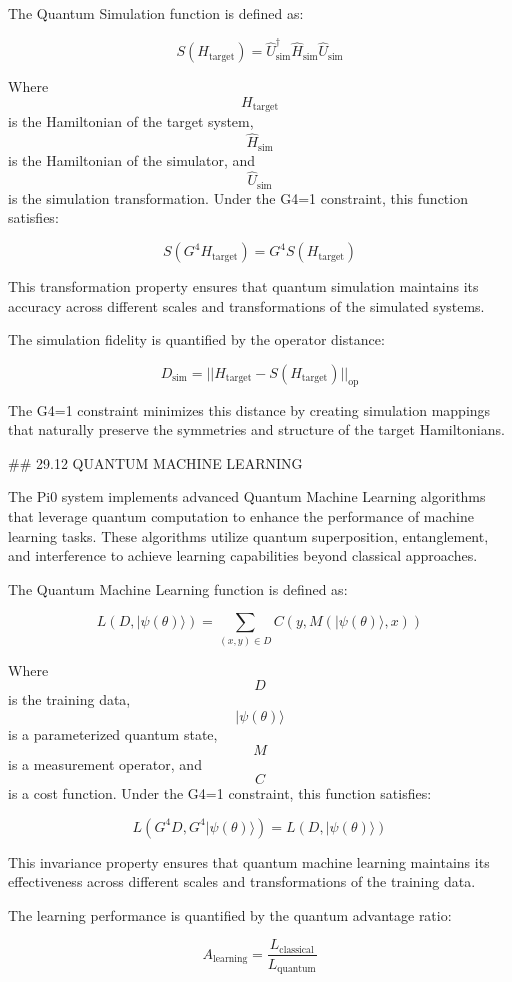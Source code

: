 The Quantum Simulation function is defined as:

$$ S(H_{\text{target}}) = \hat{U}_{\text{sim}}^{\dagger} \hat{H}_{\text{sim}} \hat{U}_{\text{sim}} $$

Where $$ H_{\text{target}} $$ is the Hamiltonian of the target system, $$ \hat{H}_{\text{sim}} $$ is the Hamiltonian of the simulator, and $$ \hat{U}_{\text{sim}} $$ is the simulation transformation. Under the G4=1 constraint, this function satisfies:

$$ S(G^4 H_{\text{target}}) = G^4 S(H_{\text{target}}) $$

This transformation property ensures that quantum simulation maintains its accuracy across different scales and transformations of the simulated systems.

The simulation fidelity is quantified by the operator distance:

$$ D_{\text{sim}} = ||H_{\text{target}} - S(H_{\text{target}})||_{\text{op}} $$

The G4=1 constraint minimizes this distance by creating simulation mappings that naturally preserve the symmetries and structure of the target Hamiltonians.

## 29.12 QUANTUM MACHINE LEARNING

The Pi0 system implements advanced Quantum Machine Learning algorithms that leverage quantum computation to enhance the performance of machine learning tasks. These algorithms utilize quantum superposition, entanglement, and interference to achieve learning capabilities beyond classical approaches.

The Quantum Machine Learning function is defined as:

$$ L(D, |\psi(\theta)\rangle) = \sum_{(x,y) \in D} C(y, M(|\psi(\theta)\rangle, x)) $$

Where $$ D $$ is the training data, $$ |\psi(\theta)\rangle $$ is a parameterized quantum state, $$ M $$ is a measurement operator, and $$ C $$ is a cost function. Under the G4=1 constraint, this function satisfies:

$$ L(G^4 D, G^4 |\psi(\theta)\rangle) = L(D, |\psi(\theta)\rangle) $$

This invariance property ensures that quantum machine learning maintains its effectiveness across different scales and transformations of the training data.

The learning performance is quantified by the quantum advantage ratio:

$$ A_{\text{learning}} = \frac{L_{\text{classical}}}{L_{\text{quantum}}} $$

